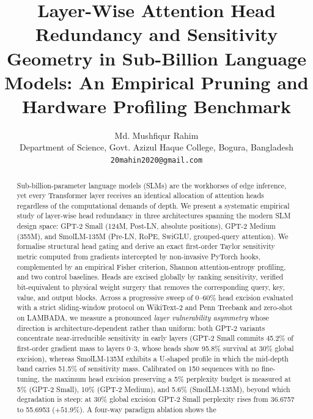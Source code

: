 \documentclass[11pt]{article}
\begin{document}
\title{Layer-Wise Attention Head Redundancy and Sensitivity Geometry in Sub-Billion Language Models: An Empirical Pruning and Hardware Profiling Benchmark}

\author{Md. Mushfiqur Rahim \\[2pt]
\small Department of Science, Govt. Azizul Haque College, Bogura, Bangladesh \\
\small \texttt{20mahin2020@gmail.com}}

\maketitle

\begin{abstract}
Sub-billion-parameter language models (SLMs) are the workhorses of edge inference,
yet every Transformer layer receives an identical allocation of attention heads
regardless of the computational demands of depth. We present a systematic empirical
study of layer-wise head redundancy in three architectures spanning the modern SLM
design space: GPT-2 Small (124M, Post-LN, absolute positions), GPT-2 Medium
(355M), and SmolLM-135M (Pre-LN, RoPE, SwiGLU, grouped-query attention). We formalise
structural head gating and derive an exact first-order Taylor sensitivity metric
computed from gradients intercepted by non-invasive PyTorch hooks, complemented by an
empirical Fisher criterion, Shannon attention-entropy profiling, and two control
baselines. Heads are excised globally by ranking sensitivity, verified bit-equivalent
to physical weight surgery that removes the corresponding query, key, value, and
output blocks. Across a progressive sweep of $0$--$60\%$ head excision evaluated with
a strict sliding-window protocol on WikiText-2 and Penn Treebank and zero-shot on
LAMBADA, we measure a pronounced \emph{layer vulnerability asymmetry} whose direction is
architecture-dependent rather than uniform: both GPT-2 variants concentrate
near-irreducible sensitivity in early layers (GPT-2 Small commits 45.2\% of
first-order gradient mass to layers 0--3, whose heads show 95.8\% survival at 30\%
global excision), whereas SmolLM-135M exhibits a U-shaped profile in which the
mid-depth band carries 51.5\% of sensitivity mass. Calibrated on 150 sequences with
no fine-tuning, the maximum head excision preserving a 5\% perplexity budget is
measured at 5\% (GPT-2 Small), 10\% (GPT-2 Medium), and 5.6\% (SmolLM-135M),
beyond which degradation is steep: at 30\% global excision GPT-2 Small perplexity
rises from 36.6757 to 55.6953 ($+51.9\%$). A four-way paradigm ablation shows the

\end{abstract}
\end{document}
